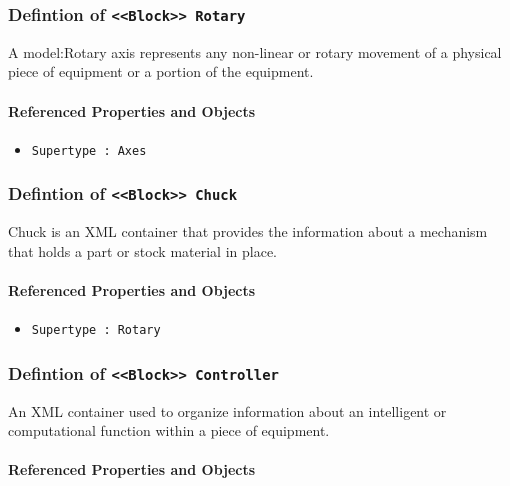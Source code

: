 \subsubsection{Defintion of \texttt{<<Block>> Rotary}}
  \label{type:Rotary}

\FloatBarrier

A {model:Rotary} axis represents any non-linear or rotary movement of a physical piece of equipment or a portion of the equipment.

\FloatBarrier
\paragraph{Referenced Properties and Objects}

\begin{itemize}
\item \texttt{Supertype : Axes}

\end{itemize}
\FloatBarrier
\subsubsection{Defintion of \texttt{<<Block>> Chuck}}
  \label{type:Chuck}

\FloatBarrier

Chuck is an XML container that provides the information about a mechanism that holds a part or stock material in place.

\FloatBarrier
\paragraph{Referenced Properties and Objects}

\begin{itemize}
\item \texttt{Supertype : Rotary}

\end{itemize}
\FloatBarrier
\subsubsection{Defintion of \texttt{<<Block>> Controller}}
  \label{type:Controller}

\FloatBarrier

An XML container used to organize information about an intelligent or computational function within a piece of equipment.

\FloatBarrier
\paragraph{Referenced Properties and Objects}

